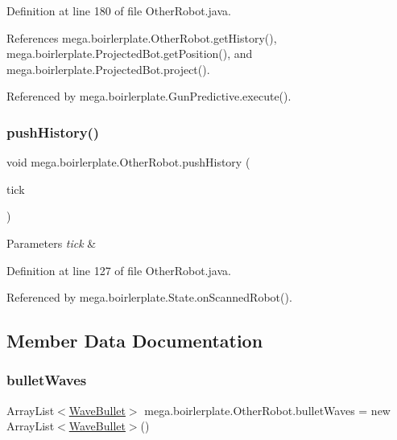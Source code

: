 Definition at line 180 of file Other\+Robot.\+java.



References mega.\+boirlerplate.\+Other\+Robot.\+get\+History(), mega.\+boirlerplate.\+Projected\+Bot.\+get\+Position(), and mega.\+boirlerplate.\+Projected\+Bot.\+project().



Referenced by mega.\+boirlerplate.\+Gun\+Predictive.\+execute().

\mbox{\label{classmega_1_1boirlerplate_1_1_other_robot_afb0b9c0e155efff23815e16901a5f310}} 
\subsubsection{\texorpdfstring{push\+History()}{pushHistory()}}
{\footnotesize\ttfamily void mega.\+boirlerplate.\+Other\+Robot.\+push\+History (\begin{DoxyParamCaption}\item[{Tick}]{tick }\end{DoxyParamCaption})}


\begin{DoxyParams}{Parameters}
{\em tick} & \\
\hline
\end{DoxyParams}


Definition at line 127 of file Other\+Robot.\+java.



Referenced by mega.\+boirlerplate.\+State.\+on\+Scanned\+Robot().



\subsection{Member Data Documentation}
\mbox{\label{classmega_1_1boirlerplate_1_1_other_robot_a5c6ab319f3f8a0a356705be5bf222a82}} 
\subsubsection{\texorpdfstring{bullet\+Waves}{bulletWaves}}
{\footnotesize\ttfamily Array\+List$<$\hyperlink{classmega_1_1boirlerplate_1_1_wave_bullet}{Wave\+Bullet}$>$ mega.\+boirlerplate.\+Other\+Robot.\+bullet\+Waves = new Array\+List$<$\hyperlink{classmega_1_1boirlerplate_1_1_wave_bullet}{Wave\+Bullet}$>$()\hspace{0.3cm}{\ttfamily [private]}}



